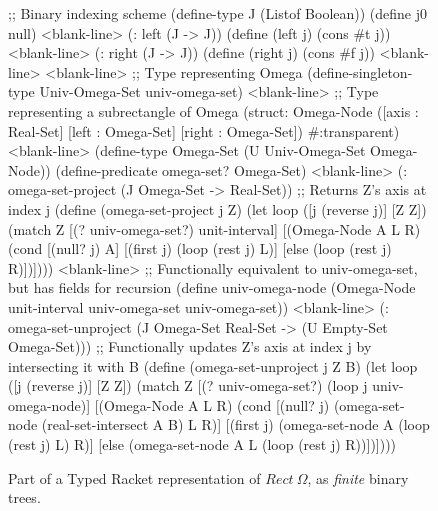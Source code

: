 \begin{figure}[p!]\centering
\begin{schemedisplay}
;; Binary indexing scheme
(define-type J (Listof Boolean))
(define j0 null)
<blank-line>
(: left (J -> J))
(define (left j) (cons #t j))
<blank-line>
(: right (J -> J))
(define (right j) (cons #f j))
<blank-line>
<blank-line>
;; Type representing Omega
(define-singleton-type Univ-Omega-Set univ-omega-set)
<blank-line>
;; Type representing a subrectangle of Omega
(struct: Omega-Node ([axis : Real-Set] [left : Omega-Set] [right : Omega-Set])
  #:transparent)
<blank-line>
(define-type Omega-Set (U Univ-Omega-Set Omega-Node))
(define-predicate omega-set? Omega-Set)
<blank-line>
(: omega-set-project (J Omega-Set -> Real-Set))
;; Returns Z's axis at index j
(define (omega-set-project j Z)
  (let loop ([j  (reverse j)] [Z Z])
    (match Z
      [(? univ-omega-set?)  unit-interval]
      [(Omega-Node A L R)
       (cond [(null? j)  A]
             [(first j)  (loop (rest j) L)]
             [else       (loop (rest j) R)])])))
<blank-line>
;; Functionally equivalent to univ-omega-set, but has fields for recursion
(define univ-omega-node
  (Omega-Node unit-interval univ-omega-set univ-omega-set))
<blank-line>
(: omega-set-unproject (J Omega-Set Real-Set -> (U Empty-Set Omega-Set)))
;; Functionally updates Z's axis at index j by intersecting it with B
(define (omega-set-unproject j Z B)
  (let loop ([j  (reverse j)] [Z Z])
    (match Z
      [(? univ-omega-set?)  (loop j univ-omega-node)]
      [(Omega-Node A L R)
       (cond [(null? j)  (omega-set-node (real-set-intersect A B) L R)]
             [(first j)  (omega-set-node A (loop (rest j) L) R)]
             [else       (omega-set-node A L (loop (rest j) R))])])))
\end{schemedisplay}
\bottomhrule
\caption[Typed Racket representation of $\mathsf{Rect}~\Omega$]{Part of a Typed Racket representation of $Rect~\Omega$, as \emph{finite} binary trees.}
\label{fig:tree-rectangle-implementation}
\end{figure}

